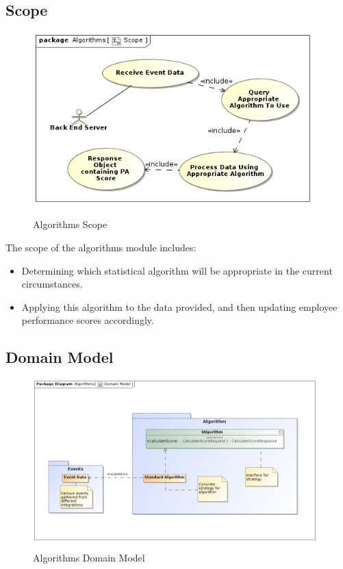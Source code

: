 \documentclass[11pt,a4paper]{article}
\begin{document}
\subsection{Scope}
\begin{figure}[H]
	\begin{center}
		\includegraphics[scale=0.75]{../Images/Algorithms Scope.jpg}
		\caption{Algorithms Scope}
	\end{center}
\end{figure}
The scope of the algorithms module includes:
\begin{itemize}
	\item Determining which statistical algorithm will be appropriate in the current circumstances.
	\item Applying this algorithm to the data provided, and then updating employee performance scores accordingly.
\end{itemize}

\subsection{Domain Model}
\begin{figure}[H]
	\begin{center}
		\includegraphics[scale=0.45]{../Images/Algorithms_Domain_Model.jpg}
		\caption{Algorithms Domain Model}
	\end{center}
\end{figure}
\end{document}
